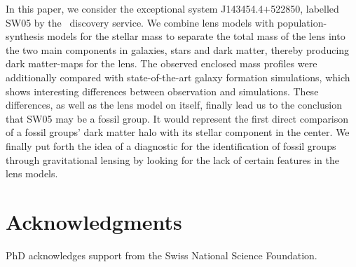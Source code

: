 \noindent In this paper, we consider the exceptional system J143454.4$+$522850,
labelled SW05 by the \SW~discovery service.  We combine lens models with
population-synthesis models for the stellar mass to separate the total mass of
the lens into the two main components in galaxies, stars and dark matter,
thereby producing dark matter-maps for the lens.  The observed enclosed mass
profiles were additionally compared with state-of-the-art galaxy formation
simulations, which shows interesting differences between observation and
simulations.  These differences, as well as the lens model on itself, finally
lead us to the conclusion that SW05 may be a fossil group.  It would represent
the first direct comparison of a fossil groups' dark matter halo with its
stellar component in the center.  We finally put forth the idea of a diagnostic
for the identification of fossil groups through gravitational lensing by looking
for the lack of certain features in the lens models.
%

\clearpage
  

  

  

  

  




% 
\section*{Acknowledgments}
PhD acknowledges support from the Swiss National Science Foundation.
